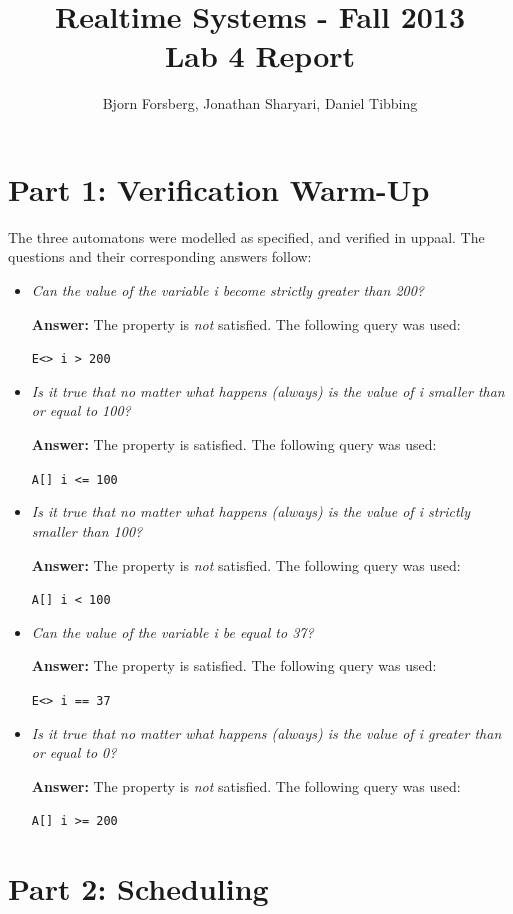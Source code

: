 \documentclass[a4paper,10pt]{article}
\title{Realtime Systems - Fall 2013 \\ \textbf{Lab 4 Report}}
\author{Bjorn Forsberg, Jonathan Sharyari, Daniel Tibbing}
\newcommand{\answer}{\textbf{Answer: }}
\newcommand{\query}[1]{\lstinline{#1}}
\begin{document}
\maketitle

\section*{Part 1: Verification Warm-Up}

The three automatons were modelled as specified, and verified in uppaal. The questions and their corresponding answers follow:

\begin{itemize}
  \item \emph{Can the value of the variable i become strictly greater than 200?}
    
    \answer The property is \emph{not} satisfied. The following query was used: 

    \query{E<> i > 200}
  \item \emph{Is it true that no matter what happens (always) is the value of i smaller than or equal to 100?}
    
    \answer The property is satisfied. The following query was used:

    \query{A[] i <= 100}
  \item \emph{Is it true that no matter what happens (always) is the value of i strictly smaller than 100?}
    
    \answer The property is \emph{not} satisfied. The following query was used:

    \query{A[] i < 100}
  \item \emph{Can the value of the variable i be equal to 37?}
    
    \answer The property is satisfied. The following query was used:

    \query{E<> i == 37}
  \item \emph{Is it true that no matter what happens (always) is the value of i greater than or equal to 0?}
    
    \answer The property is \emph{not} satisfied. The following query was used:

    \query{A[] i >= 200}
\end{itemize}

\section*{Part 2: Scheduling}
\end{document}
